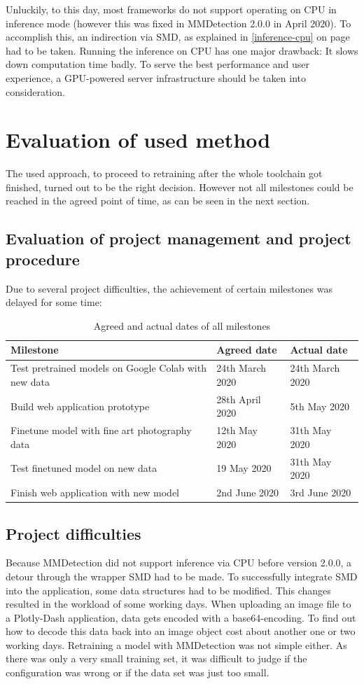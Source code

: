 Unluckily, to this day, most frameworks do not support operating on CPU in inference mode (however this was fixed in MMDetection 2.0.0 in April 2020). To accomplish this, an indirection via SMD, as explained in \ref{inference-cpu} on page \pageref{inference-cpu} had to be taken. Running the inference on CPU has one major drawback: It slows down computation time badly. To serve the best performance and user experience, a GPU-powered server infrastructure should be taken into consideration.

\section{Evaluation of used method}

The used approach, to proceed to retraining after the whole toolchain got finished, turned out to be the right decision. However not all milestones could be reached in the agreed point of time, as can be seen in the next section.

\subsection{Evaluation of project management and project procedure}

Due to several project difficulties, the achievement of certain milestones was delayed for some time:

\begin{table}[H]
\begin{tabular}{@{}lll@{}}
\toprule
Milestone & Agreed date & Actual date \\ \midrule
Test pretrained models on Google Colab with new data & 24th March 2020 & 24th March 2020 \\
Build web application prototype & 28th April 2020 & 5th May 2020 \\
Finetune model with fine art photography data & 12th May 2020 & 31th May 2020 \\
Test finetuned model on new data & 19 May 2020 & 31th May 2020 \\
Finish web application with new model & 2nd June 2020 & 3rd June 2020
\end{tabular}
\caption{Agreed and actual dates of all milestones}
\label{tab:milestones}
\end{table}
	
\subsection{Project difficulties}

Because MMDetection did not support inference via CPU before version 2.0.0, a detour through the wrapper SMD had to be made. To successfully integrate SMD into the application, some data structures had to be modified. This changes resulted in the workload of some working days.
When uploading an image file to a Plotly-Dash application, data gets encoded with a base64-encoding. To find out how to decode this data back into an image object cost about another one or two working days.
Retraining a model with MMDetection was not simple either. As there was only a very small training set, it was difficult to judge if the configuration was wrong or if the data set was just too small.